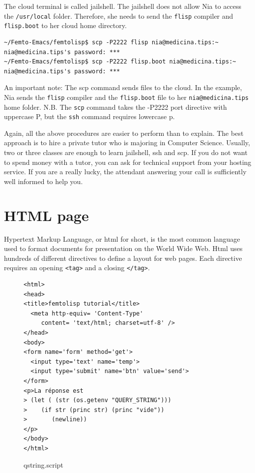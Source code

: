\documentclass[a4paper,12pt]{book}
\begin{document}
The cloud terminal  is called
jailshell. The jailshell does not allow Nia
to access the \verb|/usr/local| folder.
Therefore, she needs to send the \verb|flisp| compiler and
\verb|flisp.boot| to her cloud home directory.
\begin{Verbatim}[fontsize=\small,
frame=single,
framerule=0.5mm]
~/Femto-Emacs/femtolisp$ scp -P2222 flisp nia@medicina.tips:~
nia@medicina.tips's password: ***
~/Femto-Emacs/femtolisp$ scp -P2222 flisp.boot nia@medicina.tips:~
nia@medicina.tips's password: ***
\end{Verbatim}
An important note: The scp command sends files to
the cloud. In the example, Nia sends the \verb|flisp|
compiler and the \verb|flisp.boot| file
to her  \verb|nia@medicina.tips| home folder.
N.B. The \verb|scp| command takes the -P2222
port directive with uppercase P,
but the \verb|ssh| command requires lowercase p.

Again, all the above procedures are easier to perform
than to explain. The best approach is to hire a private
tutor who is  majoring in Computer Science.
Usually, two or three classes are enough to
learn jailshell, ssh and scp.
If you do not want to spend money with
a tutor,  you can ask for
technical support from your hosting service. 
If you are a really lucky, the attendant
answering your call is sufficiently well
informed to help you.

\section{HTML page}
Hypertext Markup Language, or html for short, is the most
common language used to format documents
for presentation on the World Wide Web.
Html uses hundreds of different directives to define
a layout for web pages. Each directive requires an
opening \verb|<tag>| and a closing \verb|</tag>|.


\begin{figure}[!h]
\begin{verbatim}
<html>
<head>
<title>femtolisp tutorial</title>
  <meta http-equiv= 'Content-Type'
     content= 'text/html; charset=utf-8' />
</head>
<body>
<form name='form' method='get'>
  <input type='text' name='temp'>
  <input type='submit' name='btn' value='send'>
</form>
<p>La réponse est  
> (let ( (str (os.getenv "QUERY_STRING")))
>    (if str (princ str) (princ "vide"))
>       (newline))
</p>
</body>
</html>
\end{verbatim}
\caption{qstring.script}
\label{lst:qstring.script}
\end{figure}
\end{document}
